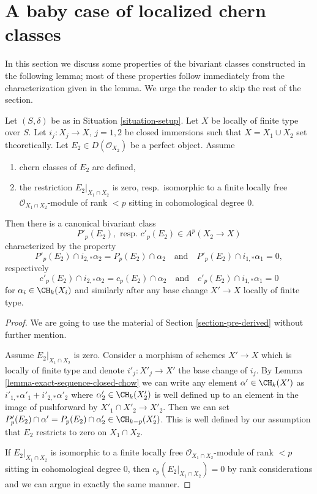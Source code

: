 \section{A baby case of localized chern classes}
\label{section-preparation-localized-chern}

\noindent
In this section we discuss some properties of the bivariant classes
constructed in the following lemma; most of these properties follow
immediately from the characterization given in the lemma. We urge the
reader to skip the rest of the section.

\begin{lemma}
\label{lemma-silly}
Let $(S, \delta)$ be as in Situation \ref{situation-setup}. Let $X$ be
locally of finite type over $S$. Let $i_j : X_j \to X$, $j = 1, 2$
be closed immersions such that $X = X_1 \cup X_2$ set theoretically. Let
$E_2 \in D(\mathcal{O}_{X_2})$ be a perfect object. Assume
\begin{enumerate}
\item chern classes of $E_2$ are defined,
\item the restriction $E_2|_{X_1 \cap X_2}$ is zero,
resp.\ isomorphic to a finite locally free $\mathcal{O}_{X_1 \cap X_2}$-module
of rank $< p$ sitting in cohomological degree $0$.
\end{enumerate}
Then there is a canonical bivariant class
$$
P'_p(E_2),\text{ resp. }c'_p(E_2) \in A^p(X_2 \to X)
$$
characterized by the property
$$
P'_p(E_2) \cap i_{2, *} \alpha_2 = P_p(E_2) \cap \alpha_2
\quad\text{and}\quad
P'_p(E_2) \cap i_{1, *} \alpha_1 = 0,
$$
respectively
$$
c'_p(E_2) \cap i_{2, *} \alpha_2 = c_p(E_2) \cap \alpha_2
\quad\text{and}\quad
c'_p(E_2) \cap i_{1, *} \alpha_1 = 0
$$
for $\alpha_i \in \CH_k(X_i)$ and similarly after any base change
$X' \to X$ locally of finite type.
\end{lemma}

\begin{proof}
We are going to use the material of Section \ref{section-pre-derived}
without further mention.

\medskip\noindent
Assume $E_2|_{X_1 \cap X_2}$ is zero.
Consider a morphism of schemes $X' \to X$
which is locally of finite type and denote $i'_j : X'_j \to X'$ the
base change of $i_j$. By Lemma \ref{lemma-exact-sequence-closed-chow}
we can write any element $\alpha' \in \CH_k(X')$ as
$i'_{1, *}\alpha'_1 + i'_{2, *}\alpha'_2$ where
$\alpha'_2 \in \CH_k(X'_2)$
is well defined up to an element in the image of pushforward
by $X'_1 \cap X'_2 \to X'_2$. Then we can set
$P'_p(E_2) \cap \alpha' = P_p(E_2) \cap \alpha'_2 \in \CH_{k - p}(X'_2)$. This
is well defined by our assumption that $E_2$ restricts
to zero on $X_1 \cap X_2$.

\medskip\noindent
If $E_2|_{X_1 \cap X_2}$ is isomorphic to a finite locally free
$\mathcal{O}_{X_1 \cap X_2}$-module of rank $< p$ sitting in
cohomological degree $0$, then $c_p(E_2|_{X_1 \cap X_2}) = 0$
by rank considerations and we can argue in exactly the same manner.
\end{proof}

